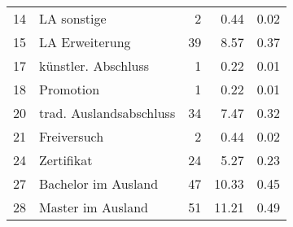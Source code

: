 \begin{longtable}{lXrrr}
        14 & \multicolumn{1}{X}{LA sonstige} & %
          \num{2} &
          \num[round-mode=places,round-precision=2]{0,44} &
          \num[round-mode=places,round-precision=2]{0,02} \\

        15 & \multicolumn{1}{X}{LA Erweiterung} & %
          \num{39} &
          \num[round-mode=places,round-precision=2]{8,57} &
          \num[round-mode=places,round-precision=2]{0,37} \\

        17 & \multicolumn{1}{X}{künstler. Abschluss} & %
          \num{1} &
          \num[round-mode=places,round-precision=2]{0,22} &
          \num[round-mode=places,round-precision=2]{0,01} \\

        18 & \multicolumn{1}{X}{Promotion} & %
          \num{1} &
          \num[round-mode=places,round-precision=2]{0,22} &
          \num[round-mode=places,round-precision=2]{0,01} \\

        20 & \multicolumn{1}{X}{trad. Auslandsabschluss} & %
          \num{34} &
          \num[round-mode=places,round-precision=2]{7,47} &
          \num[round-mode=places,round-precision=2]{0,32} \\

        21 & \multicolumn{1}{X}{Freiversuch} & %
          \num{2} &
          \num[round-mode=places,round-precision=2]{0,44} &
          \num[round-mode=places,round-precision=2]{0,02} \\

        24 & \multicolumn{1}{X}{Zertifikat} & %
          \num{24} &
          \num[round-mode=places,round-precision=2]{5,27} &
          \num[round-mode=places,round-precision=2]{0,23} \\

        27 & \multicolumn{1}{X}{Bachelor im Ausland} & %
          \num{47} &
          \num[round-mode=places,round-precision=2]{10,33} &
          \num[round-mode=places,round-precision=2]{0,45} \\

        28 & \multicolumn{1}{X}{Master im Ausland} & %
          \num{51} &
          \num[round-mode=places,round-precision=2]{11,21} &
          \num[round-mode=places,round-precision=2]{0,49} \\


\end{longtable}

